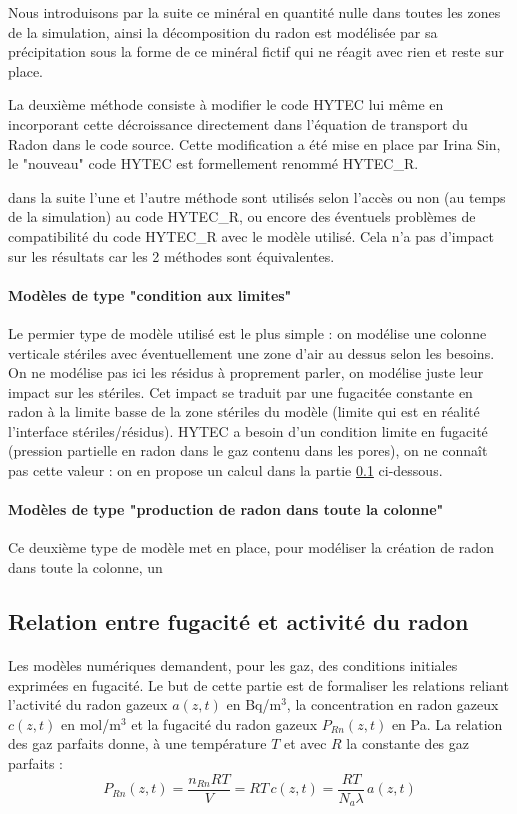 \documentclass{article}
\begin{document}
Nous introduisons par la suite ce minéral en quantité nulle dans toutes les zones de la simulation, ainsi la décomposition du radon est modélisée par sa précipitation sous la forme de ce minéral fictif qui ne réagit avec rien et reste sur place.

La deuxième méthode consiste à modifier le code HYTEC lui même en incorporant cette décroissance directement dans l'équation de transport du Radon dans le code source. Cette modification a été mise en place par Irina Sin, le "nouveau" code HYTEC est formellement renommé HYTEC\_R.

dans la suite l'une et l'autre méthode sont utilisés selon l'accès ou non (au temps de la simulation) au code HYTEC\_R, ou encore des éventuels problèmes de compatibilité du code HYTEC\_R avec le modèle utilisé. Cela n'a pas d'impact sur les résultats car les 2 méthodes sont équivalentes.
\paragraph{Modèles de type "condition aux limites" } Le permier type de modèle utilisé est le plus simple : on modélise une colonne verticale stériles avec éventuellement une zone d'air au dessus selon les besoins. On ne modélise pas ici les résidus à proprement parler, on modélise juste leur impact sur les stériles. Cet impact se traduit par une fugacitée constante en radon à la limite basse de la zone stériles du modèle (limite qui est en réalité l'interface stériles/résidus). HYTEC a besoin d'un condition limite en fugacité (pression partielle en radon dans le gaz contenu dans les pores), on ne connaît pas cette valeur : on en propose un calcul dans la partie \ref{annexe:fug_act} ci-dessous.

\paragraph{Modèles de type "production de radon dans toute la colonne"}Ce deuxième type de modèle met en place, pour modéliser la création de radon dans toute la colonne, un


\subsection{Relation entre fugacité et activité du radon}
\label{annexe:fug_act}
\paragraph{}Les modèles numériques demandent, pour les gaz, des conditions initiales exprimées en fugacité. Le but de cette partie est de formaliser les relations reliant l’activité du radon gazeux $a(z,t)$ en Bq/m$^3$, la concentration en radon gazeux $c(z,t)$ en mol/m$^3$ et la fugacité du radon gazeux $P_{Rn} (z,t)$ en Pa. La relation des gaz parfaits donne, à une température $T$ et avec $R$ la constante des gaz parfaits :
$$
P_{Rn} (z,t)=\frac{n_{Rn} RT}{V}=RT\,c(z,t)=\frac{RT}{N_a \lambda}\, a(z,t)
$$
\end{document}
